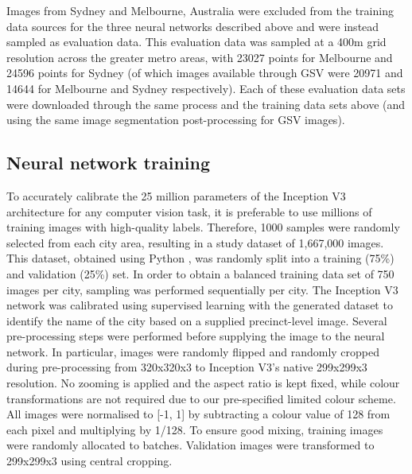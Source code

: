 \documentclass[sageh,times]{sagej}
\begin{document}

Images from Sydney and Melbourne, Australia were excluded from the training data sources for the three neural networks described above and were instead sampled as evaluation data. This evaluation data was sampled at a 400m grid resolution across the greater metro areas, with 23027 points for Melbourne and 24596 points for Sydney (of which images available through GSV were 20971 and 14644 for Melbourne and Sydney respectively). Each of these evaluation data sets were downloaded through the same process and the training data sets above (and using the same image segmentation post-processing for GSV images).



 \subsection{Neural network training}\label{sec:methods4}    

To accurately calibrate the 25 million parameters of the Inception V3 architecture for any computer vision task, it is preferable to use millions of training images with high-quality labels. Therefore, 1000 samples were randomly selected from each city area, resulting in a study dataset of 1,667,000 images. This dataset, obtained using Python \citep{Python2016}, was randomly split into a training (75\%) and validation (25\%) set. In order to obtain a balanced training data set of 750 images per city, sampling was performed sequentially per city.
The Inception V3 network was calibrated using supervised learning with the generated dataset to identify the name of the city based on a supplied precinct-level image. Several pre-processing steps were performed before supplying the image to the neural network. In particular, images were randomly flipped and randomly cropped during pre-processing from 320x320x3 to Inception V3's native 299x299x3 resolution. No zooming is applied and the aspect ratio is kept fixed, while colour transformations are not required due to our pre-specified limited colour scheme. All images were normalised to [-1, 1] by subtracting a colour value of 128 from each pixel and multiplying by 1/128. To ensure good mixing, training images were randomly allocated to batches. Validation images were transformed to 299x299x3 using central cropping.
\end{document}
